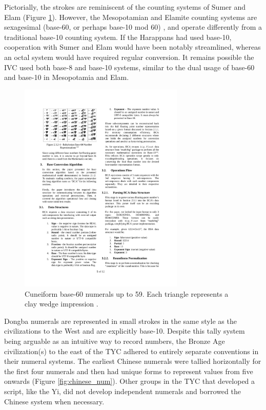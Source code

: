 \documentclass[11pt,a4paper,oneside]{report}
\begin{document}
Pictorially, the strokes are reminiscent of the counting systems of Sumer and Elam (Figure \ref{fig:base-60}). However, the Mesopotamian and Elamite counting systems are sexagesimal (base-60, or perhaps base-10 mod 60) \cite{friberg_numbers_1984, friberg_three_2019}, and operate differently from a traditional base-10 counting system. If the Harappans had used base-10, cooperation with Sumer and Elam would have been notably streamlined, whereas an octal system would have required regular conversion. It remains possible the IVC used both base-8 and base-10 systems, similar to the dual usage of base-60 and base-10 in Mesopotamia and Elam.

\begin{figure}[H] 
    \centering
    \includegraphics[width=0.7\textwidth]{Images/Kean.pdf}
    \caption[Cuneiform Base-60 Numerals]{Cuneiform base-60 numerals up to 59. Each triangle represents a clay wedge impression \cite{chew_base_2019}.}
    \label{fig:base-60}
\end{figure}

Dongba numerals are represented in small strokes in the same style as the civilizations to the West and are explicitly base-10. Despite this tally system being arguable as an intuitive way to record numbers, the Bronze Age civilization(s) to the east of the TYC adhered to entirely separate conventions in their numeral systems. The earliest Chinese numerals were tallied horizontally for the first four numerals and then had unique forms to represent values from five onwards (Figure \ref{fig:chinese_num}). Other groups in the TYC that developed a script, like the Yi, did not develop independent numerals and borrowed the Chinese system when necessary.
\end{document}
